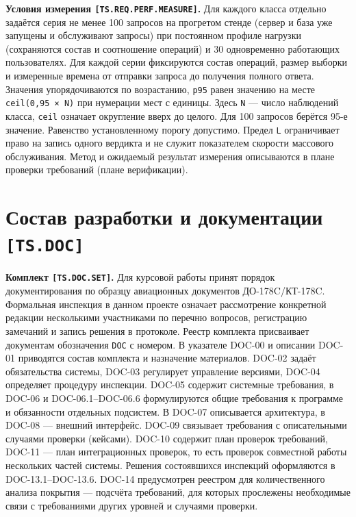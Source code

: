 \documentclass[12pt,a4paper]{article}
\begin{document}
\hypertarget{ts-req-perf-measure}{} \textbf{Условия измерения \texttt{[TS.\allowbreak{}REQ.\allowbreak{}PERF.\allowbreak{}MEASURE]}.} Для каждого класса отдельно задаётся серия не менее 100 запросов на прогретом стенде (сервер и база уже запущены и обслуживают запросы) при постоянном профиле нагрузки (сохраняются состав и соотношение операций) и 30 одновременно работающих пользователях. Для каждой серии фиксируются состав операций, размер выборки и измеренные времена от отправки запроса до получения полного ответа. Значения упорядочиваются по возрастанию, \texttt{p95} равен значению на месте \texttt{ceil(0,95\ ×\ N)} при нумерации мест с единицы. Здесь \texttt{N} --- число наблюдений класса, \texttt{ceil} означает округление вверх до целого. Для 100 запросов берётся 95-е значение. Равенство установленному порогу допустимо. Предел \texttt{L} ограничивает право на запись одного вердикта и не служит показателем скорости массового обслуживания. Метод и ожидаемый результат измерения описываются в плане проверки требований (плане верификации).

\section{\texorpdfstring{Состав разработки и документации \texttt{{[}TS.DOC{]}}}{Состав разработки и документации {[}TS.DOC{]}}}\label{4-ux441ux43eux441ux442ux430ux432-ux440ux430ux437ux440ux430ux431ux43eux442ux43aux438-ux438-ux434ux43eux43aux443ux43cux435ux43dux442ux430ux446ux438ux438-tsdoc}

\hypertarget{4-состав-разработки-и-документации-tsdoc}{}

\hypertarget{ts-doc}{}

\hypertarget{ts-doc-set}{} \textbf{Комплект \texttt{[TS.\allowbreak{}DOC.\allowbreak{}SET]}.} Для курсовой работы принят порядок документирования по образцу авиационных документов ДО-178C/КТ-178C. Формальная инспекция в данном проекте означает рассмотрение конкретной редакции несколькими участниками по перечню вопросов, регистрацию замечаний и запись решения в протоколе. Реестр комплекта присваивает документам обозначения \texttt{DOC} с номером. В указателе DOC-00 и описании DOC-01 приводятся состав комплекта и назначение материалов. DOC-02 задаёт обязательства системы, DOC-03 регулирует управление версиями, DOC-04 определяет процедуру инспекции. DOC-05 содержит системные требования, в DOC-06 и DOC-06.1--DOC-06.6 формулируются общие требования к программе и обязанности отдельных подсистем. В DOC-07 описывается архитектура, в DOC-08 --- внешний интерфейс. DOC-09 связывает требования с описательными случаями проверки (кейсами). DOC-10 содержит план проверок требований, DOC-11 --- план интеграционных проверок, то есть проверок совместной работы нескольких частей системы. Решения состоявшихся инспекций оформляются в DOC-13.1--DOC-13.6. DOC-14 предусмотрен реестром для количественного анализа покрытия --- подсчёта требований, для которых прослежены необходимые связи с требованиями других уровней и случаями проверки.
\end{document}
